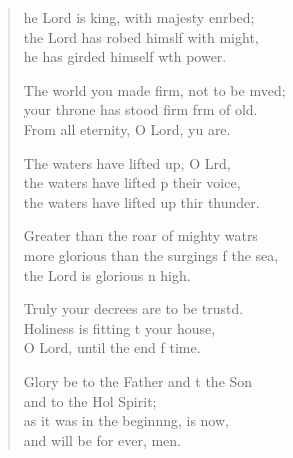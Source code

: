 \begin{verse}
  \begin{patverse}
he Lord is king, with majesty enrbed;\Flex\\
    the Lord has robed himslf with might,\Med\\
    he has girded himself w\pointup{\i}th power.

The world you made firm, not to be mved;\Flex\\
    your throne has stood firm frm of old.\Med\\
    From all eternity, O Lord, yu are.

The waters have lifted up, O Lrd,\Flex\\
    the waters have lifted p their voice,\Med\\
    the waters have lifted up thir thunder.

Greater than the roar of mighty watrs\Flex\\
    more glorious than the surgings f the sea,\Med\\
    the Lord is glorious n high.

Truly your decrees are to be trustd.\Flex\\
    Holiness is fitting t your house,\Med\\
    O Lord, until the end f time.

Glory be to the Father and t the Son\Med\\
    and to the Hol Spirit;\\
as it was in the beginn\pointup{\i}ng, is now,\Med\\
    and will be for ever, men.
  \end{patverse}
\end{verse}
